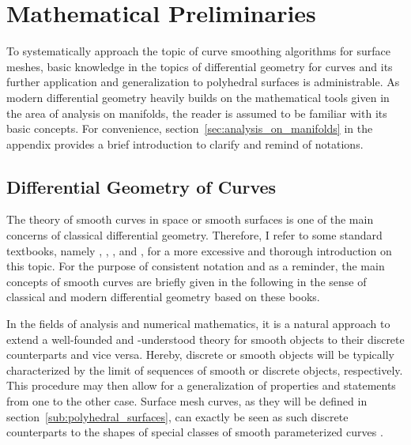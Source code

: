 \documentclass{stdlocal}
\begin{document}
\section{Mathematical Preliminaries} %
\label{sec:preliminaries}

To systematically approach the topic of curve smoothing algorithms for surface meshes, basic knowledge in the topics of differential geometry for curves and its further application and generalization to polyhedral surfaces is administrable.
As modern differential geometry heavily builds on the mathematical tools given in the area of analysis on manifolds, the reader is assumed to be familiar with its basic concepts.
For convenience, section~\ref{sec:analysis_on_manifolds} in the appendix provides a brief introduction to clarify and remind of notations.

\subsection{Differential Geometry of Curves} %
\label{sub:differential_geometry}

  The theory of smooth curves in space or smooth surfaces is one of the main concerns of classical differential geometry.
  Therefore, I refer to some standard textbooks, namely \textcite{goldhorn2009}, \textcite{carmo2016}, \textcite{kuehnel2013}, and \textcite{stahl2013}, for a more excessive and thorough introduction on this topic.
  For the purpose of consistent notation and as a reminder, the main concepts of smooth curves are briefly given in the following in the sense of classical and modern differential geometry based on these books.

  In the fields of analysis and numerical mathematics, it is a natural approach to extend a well-founded and -understood theory for smooth objects to their discrete counterparts and vice versa.
  Hereby, discrete or smooth objects will be typically characterized by the limit of sequences of smooth or discrete objects, respectively.
  This procedure may then allow for a generalization of properties and statements from one to the other case.
  Surface mesh curves, as they will be defined in section~\ref{sub:polyhedral_surfaces}, can exactly be seen as such discrete counterparts to the shapes of special classes of smooth parameterized curves \autocite{polthier2006}. \\
  \autocite{forster2016,elstrodt2011,cheney2008,goldhorn2009}
\end{document}

